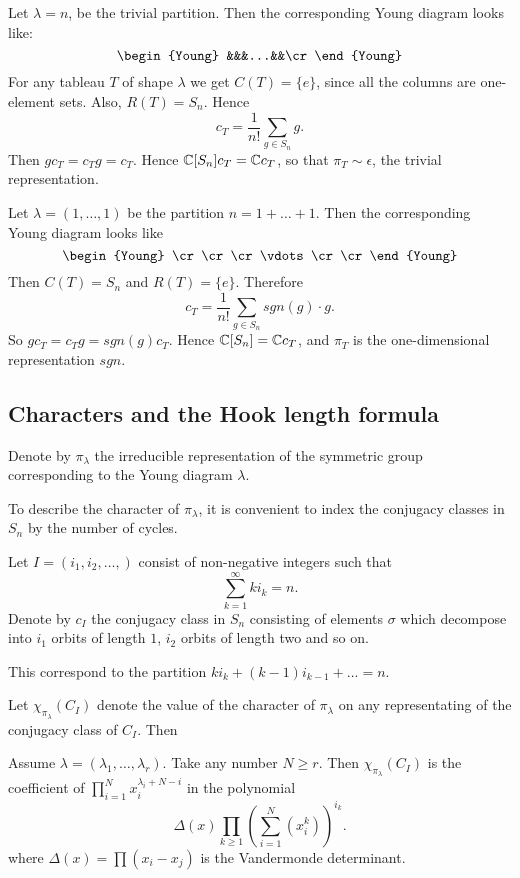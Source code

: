\documentclass[11pt, english]{article}
\begin{document}
\begin{example}
 Let $\lambda = n$, be the trivial partition. Then the corresponding Young diagram looks like:
$$
\begin{Young}
&&&...&&\cr
\end{Young}
$$
For any tableau $T$ of shape $\lambda$ we get $C(T) = \{ e\}$, since all the columns are one-element sets. Also, $R(T)=S_n$. Hence
$$
c_T = \frac{1}{n!} \sum_{g \in S_n} g.
$$
Then $gc_T = c_Tg = c_T$. Hence $\mathbb{C}[S_n]c_T = \mathbb{C} c_T$, so that $\pi_T \sim \epsilon$, the trivial representation.
\end{example}

\begin{example}
Let $\lambda = (1,\ldots,1)$ be the partition $n=1+\ldots+1$. Then the corresponding Young diagram looks like
$$
\begin{Young}
\cr
\cr \cr  \vdots \cr \cr
\end{Young}
$$
Then $C(T)=S_n$ and $R(T)=\{e \}$. Therefore
$$
c_T = \frac{1}{n!} \sum_{g \in S_n} sgn(g) \cdot g.
$$
So $g c_T = c_T g = sgn(g) c_T$. Hence $\mathbb{C}[S_n]=\mathbb{C} c_T$, and $\pi_T$ is the one-dimensional representation $sgn$. 
\end{example}

\subsection{Characters and the Hook length formula}

Denote by $\pi_\lambda$ the irreducible representation of the symmetric group corresponding to the Young diagram $\lambda$.

To describe the character of $\pi_\lambda$, it is convenient to index the conjugacy classes in $S_n$ by the number of cycles.

Let $I=(i_1,i_2,\ldots,)$ consist of non-negative integers such that
$$
\sum_{k=1}^\infty ki_k=n.
$$
Denote by $c_I$ the conjugacy class in $S_n$ consisting of elements $\sigma$ which decompose into $i_1$ orbits of length $1$, $i_2$ orbits of length two and so on. 

This correspond to the partition $ki_k+(k-1)i_{k-1}+...=n$. 

Let $\chi_{\pi_\lambda}(C_I)$ denote the value of the character of $\pi_\lambda$ on any representating of the conjugacy class of $C_I$. Then
\begin{thm}
  
Assume $\lambda=(\lambda_1,\ldots,\lambda_r)$. Take any number $N \geq r$. Then $\chi_{\pi_\lambda}(C_I)$ is the coefficient of $\prod_{i=1}^N x_i^{\lambda_i+N-i}$ in the polynomial
$$
\Delta(x) \prod_{k \geq 1} {\left(\sum_{i=1}^N (x_i^k)\right)}^{i_k}.
$$
where $\Delta(x) = \prod (x_i-x_j)$ is the Vandermonde determinant.
\end{thm}
\end{document}
